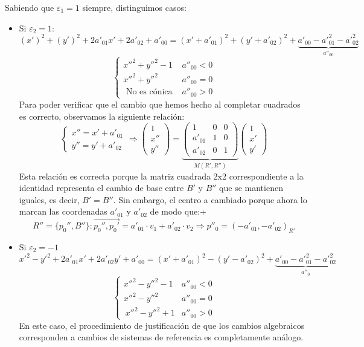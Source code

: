 \documentclass[10pt,a4paper,openright]{book}
\theoremstyle{break}
\begin{document}
Sabiendo que $\varepsilon_1 = 1$ siempre, distinguimos casos:
\begin{itemize}
\item Si $\varepsilon_2 = 1$:
$$(x')^2 + (y')^2 + 2 a'_{01} x' + 2  a'_{02} + a'_{00}= (x' + a'_{01} )^2 + (y' + a'_{02})^2 + \underbrace{a'_{00} - a'^2_{01} - a'^2_{02}}_{a''_{00}}$$
$$\begin{cases} x''^2 + y''^2 - 1 & a''_{00} < 0 \\ x''^2 + y''^2 & a''_{00} = 0 \\ \mbox{ No es cónica } & a''_{00} > 0 \end{cases}$$
Para poder verificar que el cambio que hemos hecho al completar cuadrados es correcto, observamos la siguiente relación:
$$\begin{cases}
x'' = x' + a'_{01} \\ y'' = y'  + a'_{02}
\end{cases} \Rightarrow \begin{pmatrix}
1 \\ x'' \\ y''
\end{pmatrix} =
\underbrace{\left(\begin{array}{c|cc}
1 & 0 & 0 \\
\hline
a'_{01} & 1  & 0  \\
a'_{02} &  0 &1 
\end{array}
\right)}_{M(R',R'')}
\begin{pmatrix}
1 \\ x' \\ y'
\end{pmatrix}$$
Esta relación es correcta porque la matriz cuadrada 2x2 correspondiente a la identidad representa el cambio de base entre $B'$ y $B''$ que se mantienen iguales, es decir, $B' = B''$. Sin embargo, el centro a cambiado porque ahora lo marcan las coordenadas $a'_{01}$ y $a'_{02}$ de modo que:+
$$R''=\{p_0'', B''\} : \vec{p_0'',p_0'} = a'_{01} \cdot v_1 + a'_{02} \cdot v_2 \Rightarrow p''_0 = (-a'_{01}, -a'_{02})_{R'}$$

\item Si $\varepsilon_2 = -1$
$$x'^2 - y'^2 + 2 a'_{01} x' + 2  a'_{02}y' + a'_{00} = (x' + a'_{01} )^2 - (y' - a'_{02})^2 + \underbrace{a'_{00} - a'^2_{01} - a'^2_{02}}_{a''_0} $$
$$\begin{cases} x''^2 - y''^2 - 1 & a''_{00} < 0 \\ x''^2 - y''^2 & a''_{00} = 0 \\ \ x''^2 - y''^2 + 1 & a''_{00} > 0 \end{cases}$$
En este caso, el procedimiento de justificación de que los cambios algebraicos corresponden a cambios de sistemas de referencia es completamente análogo.


\end{itemize}
\end{document}
